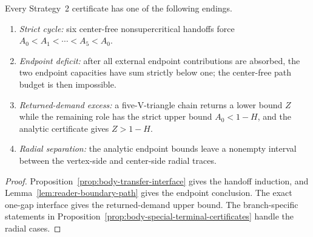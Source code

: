 \begin{proposition}
\label{prop:body-strategy2-chain-principle}
Every Strategy~2 certificate has one of the following endings.

\begin{enumerate}
\item \emph{Strict cycle:} six center-free nonsupercritical handoffs force
$A_0<A_1<\cdots<A_5<A_0$.
\item \emph{Endpoint deficit:} after all external endpoint contributions are
absorbed, the two endpoint capacities have sum strictly below one; the
center-free path budget is then impossible.
\item \emph{Returned-demand excess:} a five-V-triangle chain returns a lower
bound $Z$ while the remaining role has the strict upper bound
$A_0<1-H$, and the analytic certificate gives $Z>1-H$.
\item \emph{Radial separation:} the analytic endpoint bounds leave a
nonempty interval between the vertex-side and center-side radial traces.
\end{enumerate}
\end{proposition}

\begin{proof}
Proposition~\ref{prop:body-transfer-interface} gives the handoff induction,
and Lemma~\ref{lem:reader-boundary-path} gives the endpoint conclusion.  The
exact one-gap interface gives the returned-demand upper bound.  The
branch-specific statements in
Proposition~\ref{prop:body-special-terminal-certificates} handle the radial
cases.
\end{proof}
